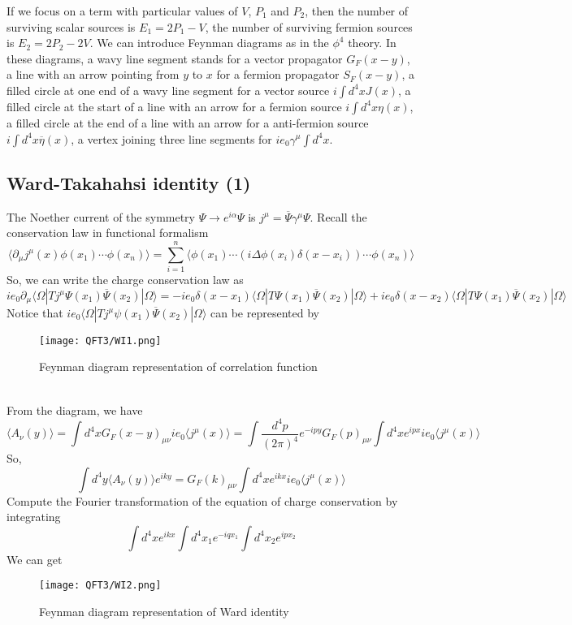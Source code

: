 \documentclass[cyan]{elegantnote}
\begin{document}
If we focus on a term with particular values of $V$, $P_1$ and $P_2$, then the number of surviving scalar sources is $E_1 = 2P_1-V$, the number of surviving fermion sources is $E_2 = 2P_2-2V$.
We can introduce Feynman diagrams as in the $\phi^4$ theory. In these diagrams, a wavy line segment stands for a vector propagator $G_F(x-y)$, a line with an arrow pointing from $y$ to $x$ for a fermion propagator $S_F(x-y)$, a filled circle at one end of a wavy line segment for a vector source $i\int d^4x J(x)$, a filled circle at the start of a line with an arrow for a fermion source $i\int d^4x \eta(x)$, a filled circle at the end of a line with an arrow for a anti-fermion source $i\int d^4x \overline{\eta}(x)$, a vertex joining three line segments for $ie_0\gamma^{\mu}\int d^4x$.

\subsection{Ward-Takahahsi identity (1)}
The Noether current of the symmetry $\Psi \to e^{i\alpha}\Psi$ is $j^{\mu} = \overline{\Psi}\gamma^{\mu}\Psi$. Recall the conservation law in functional formalism
\[\langle \partial_{\mu} j^{\mu}(x) \phi(x_1)\cdots\phi(x_n) \rangle  = \sum_{i=1}^{n} \langle \phi(x_1) \cdots (i\Delta \phi(x_i)\delta(x-x_i)) \cdots \phi(x_n) \rangle\]
So, we can write the charge conservation law as
\[ie_0\partial_{\mu} \langle \Omega | T j^{\mu} \Psi(x_1) \overline{\Psi}(x_2)| \Omega\rangle = -ie_0\delta(x-x_1)\langle \Omega | T \Psi(x_1) \overline{\Psi}(x_2)| \Omega\rangle + ie_0\delta(x-x_2)\langle \Omega | T \Psi(x_1) \overline{\Psi}(x_2)| \Omega\rangle\]
Notice that $ie_0\langle \Omega | T j^{\mu} \psi(x_1) \overline{\Psi}(x_2)| \Omega\rangle$ can be represented by
\begin{figure}[!h]
\centering
\texttt{[image: QFT3/WI1.png]}
\caption{Feynman diagram representation of correlation function}
\end{figure}\\
From the diagram, we have
\[\langle A_{\nu}(y) \rangle = \int d^4x G_F(x-y)_{\mu\nu} ie_0\langle j^{\mu}(x) \rangle  = \int \frac{d^4p}{(2\pi)^4} e^{-ipy} G_F(p)_{\mu\nu} \int d^4x e^{ipx} ie_0\langle j^{\mu}(x) \rangle\]
So,
\[\int d^4y \langle A_{\nu}(y) \rangle e^{iky} = G_F(k)_{\mu\nu} \int d^4x e^{ikx} ie_0\langle j^{\mu}(x)\rangle\]
Compute the Fourier transformation of the equation of charge conservation by integrating
\[\int d^4x e^{ikx} \int d^4x_1 e^{-iqx_1} \int d^4x_2 e^{ipx_2}\]
We can get
\begin{figure}[!h]
\centering
\texttt{[image: QFT3/WI2.png]}
\caption{Feynman diagram representation of Ward identity}
\end{figure}\\
\end{document}
